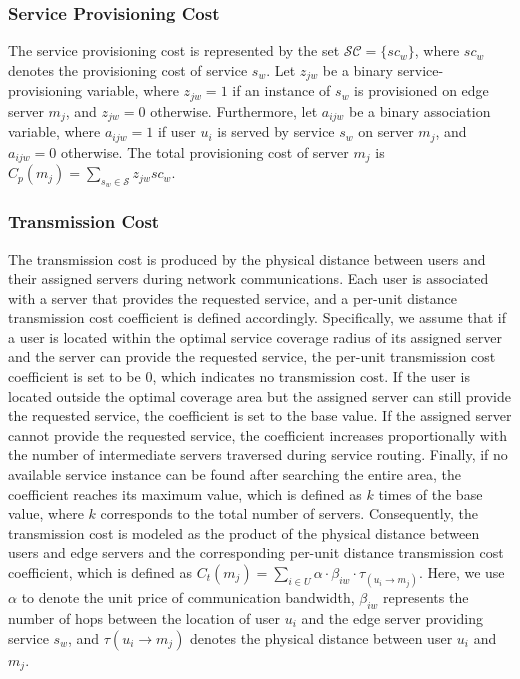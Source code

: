 \documentclass[10pt, conference, letterpaper]{IEEEtran}
\begin{document}

\subsubsection{Service Provisioning Cost} 

The service provisioning cost is represented by the set $\mathcal{SC}=\{sc_w\}$, where $sc_w$ denotes the provisioning cost of service $s_w$. Let $z_{jw}$ be a binary service-provisioning variable, where $z_{jw}=1$ if an instance of $s_w$ is provisioned on edge server $m_j$, and $z_{jw}=0$ otherwise. Furthermore, let $a_{ijw}$ be a binary association variable, where $a_{ijw}=1$ if user $u_i$ is served by service $s_w$ on server $m_j$, and $a_{ijw}=0$ otherwise. The total provisioning cost of server $m_j$ is $C_p(m_j)=\sum_{s_w\in\mathcal{S}}z_{jw}sc_w$.


\subsubsection{Transmission Cost}
The transmission cost is produced by the physical distance between users and their assigned servers during network communications. Each user is associated with a server that provides the requested service, and a per-unit distance transmission cost coefficient is defined accordingly. Specifically, we assume that if a user is located within the optimal service coverage radius of its assigned server and the server can provide the requested service, the per-unit transmission cost coefficient is set to be $0$, which indicates no transmission cost. If the user is located outside the optimal coverage area but the assigned server can still provide the requested service, the coefficient is set to the base value. If the assigned server cannot provide the requested service, the coefficient increases proportionally with the number of intermediate servers traversed during service routing. Finally, if no available service instance can be found after searching the entire area, the coefficient reaches its maximum value, which is defined as $k$ times of the base value, where $k$ corresponds to the total number of servers. Consequently, the transmission cost is modeled as the product of the physical distance between users and edge servers and the corresponding per-unit distance transmission cost coefficient, which is defined as $C_{t}(m_j) = \sum_{i \in U} \alpha\cdot \beta_{iw}\cdot\tau_{(u_i \rightarrow m_j)}$. Here, we use $\alpha$ to denote the unit price of communication bandwidth, $\beta_{iw}$ represents the number of hops between the location of user $u_i$ and the edge server providing service $s_w$, and $\tau(u_i \rightarrow m_j)$ denotes the physical distance between user $u_i$ and $m_j$.
\end{document}
